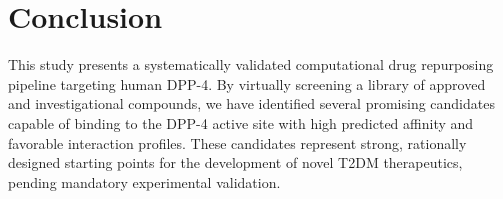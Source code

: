 \documentclass[12pt]{article}
\begin{document}
\section{Conclusion}
This study presents a systematically validated computational drug repurposing pipeline targeting human DPP-4. By virtually screening a library of approved and investigational compounds, we have identified several promising candidates capable of binding to the DPP-4 active site with high predicted affinity and favorable interaction profiles. These candidates represent strong, rationally designed starting points for the development of novel T2DM therapeutics, pending mandatory experimental validation.



\end{document}
